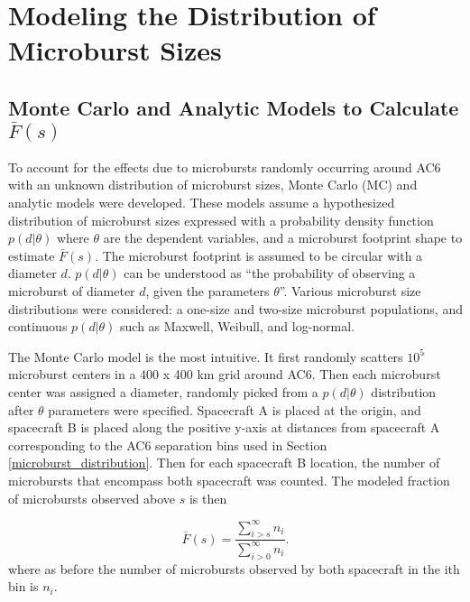 \section{Modeling the Distribution of Microburst Sizes} \label{model_section}
\subsection{Monte Carlo and Analytic Models to Calculate $\bar{F}(s)$}

To account for the effects due to microbursts randomly occurring around AC6 with an unknown distribution of microburst sizes, Monte Carlo (MC) and analytic models were developed. These models assume a hypothesized distribution of microburst sizes expressed with a probability density function $p(d | \theta)$ where $\theta$ are the dependent variables, and a microburst footprint shape to estimate $\bar{F}(s)$. The microburst footprint is assumed to be circular with a diameter $d$. $p(d | \theta)$ can be understood as ``the probability of observing a microburst of diameter $d$, given the parameters $\theta$''. Various microburst size distributions were considered: a one-size and two-size microburst populations, and continuous $p(d | \theta)$ such as Maxwell, Weibull, and log-normal.

The Monte Carlo model is the most intuitive. It first randomly scatters $10^5$ microburst centers in a 400 x 400 km grid around AC6. Then each microburst center was assigned a diameter, randomly picked from a $p(d | \theta)$ distribution after $\theta$ parameters were specified. Spacecraft A is placed at the origin, and spacecraft B is placed along the positive y-axis at distances from spacecraft A corresponding to the AC6 separation bins used in Section \ref{microburst_distribution}. Then for each spacecraft B location, the number of microbursts that encompass both spacecraft was counted. The modeled fraction of microbursts observed above $s$ is then

\begin{equation}
\bar{F}(s) = \frac{\displaystyle\sum_{i > s}^\infty n_{i} }{ \displaystyle\sum_{i > 0}^\infty n_{i} }.
\end{equation} where as before the number of microbursts observed by both spacecraft in the ith bin is $n_{i}$.

